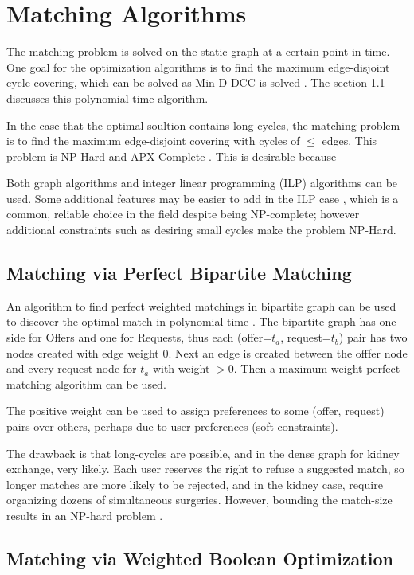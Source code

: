 \documentclass[main.tex]{subfiles}
\begin{document}
\section{Matching Algorithms}
The matching problem is solved on the static graph at a certain point in time. One goal for the optimization algorithms is to find the maximum edge-disjoint cycle covering, which can be solved as Min-D-DCC is solved \cite{Man1} \cite{Bir}. The section \ref{bima} discusses this polynomial time algorithm.

In the case that the optimal soultion contains long cycles, the matching problem is to find the maximum edge-disjoint covering with cycles of $\leq$ edges. This problem is NP-Hard and APX-Complete \cite{Bir}. This is desirable because

Both graph algorithms and integer linear programming (ILP) algorithms can be used. Some additional features may be easier to add in the ILP case , which is a common, reliable choice in the field despite being NP-complete; however additional constraints such as desiring small cycles make the problem NP-Hard.

\subsection{Matching via Perfect Bipartite Matching}\label{bima}

An algorithm to find perfect weighted matchings in bipartite graph can be used to discover the optimal match in polynomial time \cite{Bir}. The bipartite graph has one side for Offers and one for Requests, thus each (offer=$t_a$, request=$t_b$) pair has two nodes created with edge weight $0$. Next an edge is created between the offfer node and every request node for $t_a$ with weight $> 0$. Then a maximum weight perfect matching algorithm can be used.

The positive weight can be used to assign preferences to some (offer, request) pairs over others, perhaps due to user preferences (soft constraints).

The drawback is that long-cycles are possible, and in the dense graph for kidney exchange, very likely. Each user reserves the right to refuse a suggested match, so longer matches are more likely to be rejected, and in the kidney case, require organizing dozens of simultaneous surgeries. However, bounding the match-size results in an NP-hard problem \cite{Bir}.

\subsection{Matching via Weighted Boolean Optimization}
\end{document}
